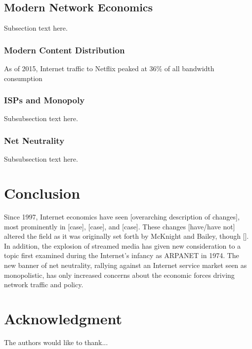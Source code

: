 \documentclass[conference]{IEEEtran}
\begin{document}
\subsection{Modern Network Economics}
Subsection text here.

\subsubsection{Modern Content Distribution}
As of 2015, Internet traffic to Netflix peaked at 36\% of all bandwidth consumption \cite{spangler15}
\subsubsection{ISPs and Monopoly}
Subsubsection text here.
\subsubsection{Net Neutrality}
Subsubsection text here.

\section{Conclusion}
Since 1997, Internet economics have seen [overarching description of changes], most prominently in [case], [case], and [case]. These changes [have/have not] altered the field as it was originally set forth by McKnight and Bailey, though []. In addition, the explosion of streamed media has given new consideration to a topic first examined during the Internet's infancy as ARPANET in 1974. The new banner of net neutrality, rallying against an Internet service market seen as monopolistic, has only increased concerns about the economic forces driving network traffic and policy.

\section*{Acknowledgment}
The authors would like to thank...

\end{document}
